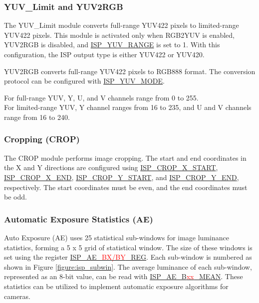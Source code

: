 \documentclass[main\_\_EN.tex]{subfiles}
\begin{document}
\subsubsection{YUV\_Limit and YUV2RGB}
\label{sec:isp_yuv2rgb}
The YUV\_Limit module converts full-range YUV422 pixels to limited-range YUV422 pixels. This module is activated only when RGB2YUV is enabled, YUV2RGB is disabled, and \hyperref[fielddesc:ISPYUVRANGE]{ISP\_YUV\_RANGE} is set to 1. With this configuration, the ISP output type is either YUV422 or YUV420.

YUV2RGB converts full-range YUV422 pixels to RGB888 format. The conversion protocol can be configured with \hyperref[fielddesc:ISPYUVMODE]{ISP\_YUV\_MODE}.

\begin{tiplisting}
    For full-range YUV, Y, U, and V channels range from 0 to 255.\\
    For limited-range YUV, Y channel ranges from 16 to 235, and U and V channels range from 16 to 240.
\end{tiplisting}


\subsubsection{Cropping (CROP)}
\label{sec:isp_crop}
The CROP module performs image cropping. The start and end coordinates in the X and Y directions are configured using \hyperref[fielddesc:ISPCROPXSTART]{ISP\_CROP\_X\_START}, \hyperref[fielddesc:ISPCROPXEND]{ISP\_CROP\_X\_END}, \hyperref[fielddesc:ISPCROPYSTART]{ISP\_CROP\_Y\_START}, and \hyperref[fielddesc:ISPCROPYEND]{ISP\_CROP\_Y\_END}, respectively. The start coordinates must be even, and the end coordinates must be odd.


\subsubsection{Automatic Exposure Statistics (AE)}

Auto Exposure (AE) uses 25 statistical sub-windows for image luminance statistics, forming a 5 x 5 grid of statistical window. The size of these windows is set using the register \hyperref[regdesc:ISPAEBXREG]{ISP\_AE\_\textcolor{red}{BX/BY}\_REG}. Each sub-window is numbered as shown in Figure \ref{figure:isp_subwin}. The average luminance of each sub-window, represented as an 8-bit value, can be read with \hyperref[fielddesc:ISPAEB00MEAN]{ISP\_AE\_B\textcolor{red}{xx}\_MEAN}. These statistics can be utilized to implement automatic exposure algorithms for cameras.
\end{document}
